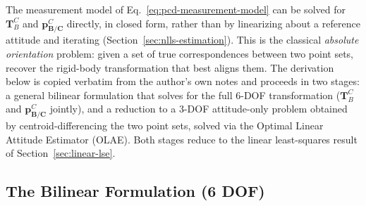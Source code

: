 \documentclass{article}
\newcommand{\vect}[1]{\mathbf{#1}}
\newcommand{\mat}[1]{\mathbf{#1}}
\newcommand{\TCB}{\mat{T}^C_{B}}
\newcommand{\pBCC}{\vect{p}^{\mathit{C}}_{\mathbf{B}/\mathbf{C}}}
\begin{document}
The measurement model of Eq.~\eqref{eq:pcd-measurement-model} can be solved for $\TCB$ and $\pBCC$ directly, in closed form, rather than by linearizing about a reference attitude and iterating (Section~\ref{sec:nlls-estimation}). This is the classical \emph{absolute orientation} problem: given a set of true correspondences between two point sets, recover the rigid-body transformation that best aligns them. The derivation below is copied verbatim from the author's own notes and proceeds in two stages: a general bilinear formulation that solves for the full 6-DOF transformation ($\TCB$ and $\pBCC$ jointly), and a reduction to a 3-DOF attitude-only problem obtained by centroid-differencing the two point sets, solved via the Optimal Linear Attitude Estimator (OLAE). Both stages reduce to the linear least-squares result of Section~\ref{sec:linear-lse}.

\subsection{The Bilinear Formulation (6 DOF)}
\end{document}
